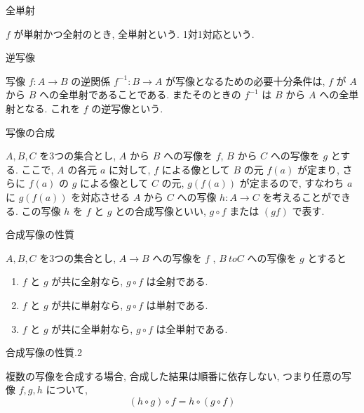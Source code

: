 \documentclass[8pt, jfont=ipaexm]{beamer} %
\begin{document}
\begin{frame}{全単射}
    \begin{block}{}
    $f$ が単射かつ全射のとき, 全単射という. 1対1対応という.
    \end{block}
\end{frame}


\begin{frame}{逆写像}
    \begin{block}{}
        写像 $f : A \to B$ の逆関係 $f^{-1} : B \to A$ が写像となるための必要十分条件は, $f$ が $A$ から $B$ への全単射であることである. またそのときの $f^{-1}$ は $B$ から $A$ への全単射となる. これを $f$ の逆写像という.
    \end{block}
\end{frame}

\begin{frame}{写像の合成}
    \begin{block}{}
        $A, B, C$ を3つの集合とし, $A$ から $B$ への写像を $f$, $B$ から $C$ への写像を $g$ とする. ここで, $A$ の各元 $a$ に対して, $f$ による像として $B$ の元 $f(a)$ が定まり, さらに $f(a)$ の $g$ による像として $C$ の元, $g(f(a))$ が定まるので, すなわち $a$ に $g(f(a))$ を対応させる $A$ から $C$ への写像 $h: A \to C$ を考えることができる. この写像 $h$ を $f$ と $g$ との合成写像といい, $g \circ f$ または $(gf)$ で表す. 
    \end{block}
\end{frame}

\begin{frame}{合成写像の性質}
    \begin{block}{}
        $A, B, C$ を3つの集合とし, $A \to B$ への写像を $f$ , $B \ to C$ への写像を $g$ とすると
        \begin{enumerate}
            \item $f$ と $g$ が共に全射なら, $g \circ f$ は全射である.
            \item $f$ と $g$ が共に単射なら, $g \circ f$ は単射である.
            \item $f$ と $g$ が共に全単射なら, $g \circ f$ は全単射である.
        \end{enumerate}
    \end{block}
\end{frame}

\begin{frame}{合成写像の性質.2}
    \begin{block}{}
        複数の写像を合成する場合, 合成した結果は順番に依存しない, つまり任意の写像 $f, g, h$ について,
        \begin{equation*}
            (h \circ g) \circ f = h \circ (g \circ f)
        \end{equation*}
    \end{block}
    
\end{frame}
\end{document}

